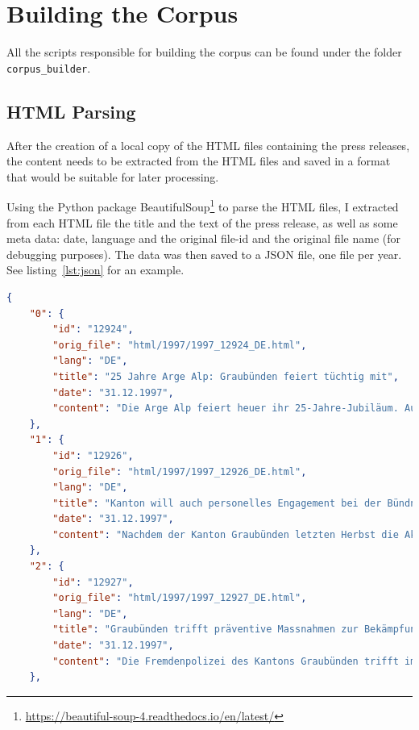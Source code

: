 \section{Building the Corpus}
All the scripts responsible for building the corpus can be found under the folder \texttt{corpus\_builder}.

\subsection{HTML Parsing}
After the creation of a local copy of the HTML files containing the press releases, the content needs to be extracted from the HTML files and saved in a format that would be suitable for later processing.

Using the Python package BeautifulSoup\footnote{\url{https://beautiful-soup-4.readthedocs.io/en/latest/}} to parse the HTML files, I extracted from each HTML file the title and the text of the press release, as well as some meta data: date, language and the original file-id and the original file name (for debugging purposes).  
The data was then saved to a JSON file, one file per year.
See listing~\ref{lst:json} for an example.


\begin{lstlisting}[caption={Example for a JSON file containing the press releases extracted from the HTML files.}, captionpos=b, label=lst:json, language=json]
{
    "0": {
        "id": "12924",
        "orig_file": "html/1997/1997_12924_DE.html",
        "lang": "DE",
        "title": "25 Jahre Arge Alp: Graubünden feiert tüchtig mit",
        "date": "31.12.1997",
        "content": "Die Arge Alp feiert heuer ihr 25-Jahre-Jubiläum. Aus diesem Grund finden vom 27. September bis 12. Oktober 1997 die Festwochen des Alpenraums in Telfs-Mösern, Tirol, statt. ..."
    },
    "1": {
        "id": "12926",
        "orig_file": "html/1997/1997_12926_DE.html",
        "lang": "DE",
        "title": "Kanton will auch personelles Engagement bei der Bündner Kraftwerke AG verstärken",
        "date": "31.12.1997",
        "content": "Nachdem der Kanton Graubünden letzten Herbst die Aktienmehrheit der Bündner Kraftwerke AG übernommen hat, will er nun auch seine Vertretung im Verwaltungsrat stärken...."
    },
    "2": {
        "id": "12927",
        "orig_file": "html/1997/1997_12927_DE.html",
        "lang": "DE",
        "title": "Graubünden trifft präventive Massnahmen zur Bekämpfung der illegalen Einwanderung",
        "date": "31.12.1997",
        "content": "Die Fremdenpolizei des Kantons Graubünden trifft im Einvernehmen mit dem kantonalen Sozialamt, dem Amt für Zivilschutz sowie der Kantonspolizei Graubünden Massnahmen, um die illegale Einwanderung in den Südtälern des Kantons Graubünden zu bekämpfen...."
    },
\end{lstlisting}

